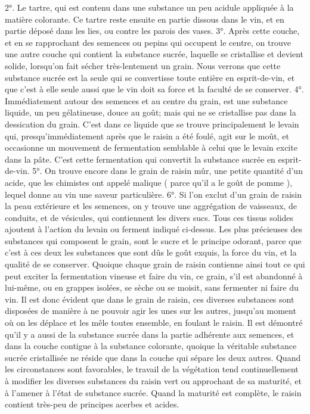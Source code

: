 2°. Le tartre, qui est contenu dans une substance un peu acidule appliquée à la matière colorante. Ce tartre reste ensuite en partie dissous dans le vin, et en partie déposé dans les lies, ou contre les parois des vases.
3°. Après cette couche, et en se rapprochant des semences ou pepins qui occupent le centre, on trouve une autre couche qui contient la substance sucrée, laquelle se cristallise et devient solide, lorsqu'on fait sécher très-lentement un grain. Nous verrons que cette substance sucrée est la seule qui se\setcounter{page}{82} convertisse toute entière en esprit-de-vin, et que c'est à elle seule aussi que le vin doit sa force et la faculté de se conserver.
4°. Immédiatement autour des semences et au centre du grain, est une substance liquide, un peu gélatineuse, douce au goût; mais qui ne se cristallise pas dans la dessication du grain. C'est dans ce liquide que se trouve principalement le levain qui, presqu'immédiatement après que le raisin a été foulé, agit sur le moût, et occasionne un mouvement de fermentation semblable à celui que le levain excite dans la pâte. C'est cette fermentation qui convertit la substance sucrée en esprit-de-vin.
5°. On trouve encore dans le grain de raisin mûr, une petite quantité d'un acide, que les chimistes ont appelé malique ( parce qu'il a le goût de pomme ), lequel donne au vin une saveur particulière.
6°. Si l'on exclut d'un grain de raisin la peau extérieure et les semences, on y trouve une aggrégation de vaisseaux, de conduits, et de vésicules, qui contiennent les divers sucs. Tous ces tissus solides ajoutent à l'action du levain ou ferment indiqué ci-dessus.
Les plus précieuses des substances qui composent le grain, sont le sucre et le principe odorant, parce que c'est à ces deux\setcounter{page}{83} les substances que sont dûs le goût exquis, la force du vin, et la qualité de se conserver.
Quoique chaque grain de raisin contienne ainsi tout ce qui peut exciter la fermentation vineuse et faire du vin, ce grain, s'il est abandonné à lui-même, ou en grappes isolées, se sèche ou se moisit, sans fermenter ni faire du vin. Il est donc évident que dans le grain de raisin, ces diverses substances sont disposées de manière à ne pouvoir agir les unes sur les autres, jusqu'au moment où on les déplace et les mêle toutes ensemble, en foulant le raisin.
Il est démontré qu'il y a aussi de la substance sucrée dans la partie adhérente aux semences, et dans la couche contigue à la substance colorante, quoique la véritable substance sucrée cristallisée ne réside que dans la couche qui sépare les deux autres.
Quand les circonstances sont favorables, le travail de la végétation tend continuellement à modifier les diverses substances du raisin vert ou approchant de sa maturité, et à l'amener à l'état de substance sucrée. Quand la maturité est complète, le raisin contient très-peu de principes acerbes et acides.
